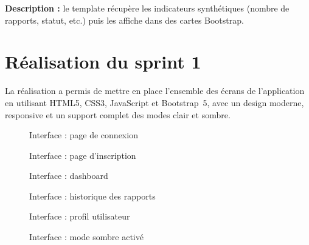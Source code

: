 \textbf{Description :} le template récupère les indicateurs synthétiques (nombre de
rapports, statut, etc.) puis les affiche dans des cartes Bootstrap.

\section{Réalisation du sprint 1}
La réalisation a permis de mettre en place l'ensemble des écrans de l'application en
utilisant HTML5, CSS3, JavaScript et Bootstrap~5, avec un design moderne, responsive
et un support complet des modes clair et sombre.

\begin{figure}[h!]
\centering
{}
\caption{Interface : page de connexion}
\end{figure}

\begin{figure}[h!]
\centering
{}
\caption{Interface : page d'inscription}
\end{figure}

\begin{figure}[h!]
\centering
{}
\caption{Interface : dashboard}
\end{figure}

\begin{figure}[h!]
\centering
{}
\caption{Interface : historique des rapports}
\end{figure}

\begin{figure}[h!]
\centering
{}
\caption{Interface : profil utilisateur}
\end{figure}

\begin{figure}[h!]
\centering
{}
\caption{Interface : mode sombre activé}
\end{figure}

